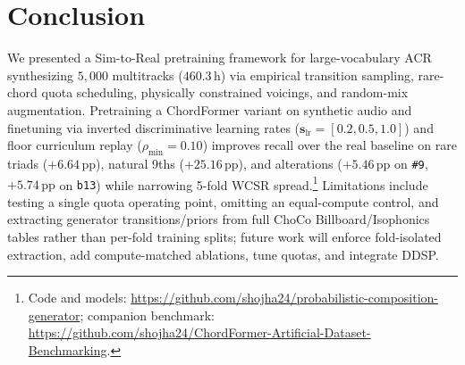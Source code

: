 \section{Conclusion}\label{sec:conclusion}

We presented a Sim-to-Real pretraining framework for large-vocabulary ACR synthesizing $5{,}000$ multitracks ($460.3\,\text{h}$) via empirical transition sampling, rare-chord quota scheduling, physically constrained voicings, and random-mix augmentation. Pretraining a ChordFormer variant on synthetic audio and finetuning via inverted discriminative learning rates ($\mathbf{s}_{\text{lr}} = [0.2, 0.5, 1.0]$) and floor curriculum replay ($\rho_{\min}=0.10$) improves recall over the real baseline on rare triads ($+6.64\,\text{pp}$), natural 9ths ($+25.16\,\text{pp}$), and alterations ($+5.46\,\text{pp}$ on {\small\texttt{\#9}}, $+5.74\,\text{pp}$ on {\small\texttt{b13}}) while narrowing 5-fold WCSR spread.\footnote{Code and models: \url{https://github.com/shojha24/probabilistic-composition-generator}; companion benchmark: \url{https://github.com/shojha24/ChordFormer-Artificial-Dataset-Benchmarking}.} Limitations include testing a single quota operating point, omitting an equal-compute control, and extracting generator transitions/priors from full ChoCo Billboard/Isophonics tables rather than per-fold training splits; future work will enforce fold-isolated extraction, add compute-matched ablations, tune quotas, and integrate DDSP.
